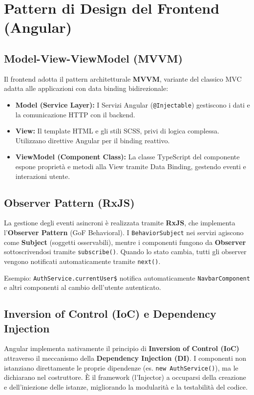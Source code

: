 \section{Pattern di Design del Frontend (Angular)}

\subsection{Model-View-ViewModel (MVVM)}
Il frontend adotta il pattern architetturale \textbf{MVVM}, variante del classico MVC 
adatta alle applicazioni con data binding bidirezionale:
\begin{itemize}
    \item \textbf{Model (Service Layer):} I Servizi Angular (\texttt{@Injectable}) 
    gestiscono i dati e la comunicazione HTTP con il backend.
    \item \textbf{View:} Il template HTML e gli stili SCSS, privi di logica complessa. 
    Utilizzano direttive Angular per il binding reattivo.
    \item \textbf{ViewModel (Component Class):} La classe TypeScript del componente 
    espone proprietà e metodi alla View tramite Data Binding, gestendo eventi e 
    interazioni utente.
\end{itemize}

\subsection{Observer Pattern (RxJS)}
La gestione degli eventi asincroni è realizzata tramite \textbf{RxJS}, che implementa 
l'\textbf{Observer Pattern} (GoF Behavioral). I \texttt{BehaviorSubject} nei servizi 
agiscono come \textbf{Subject} (soggetti osservabili), mentre i componenti fungono da 
\textbf{Observer} sottoscrivendosi tramite \texttt{subscribe()}. Quando lo stato cambia, 
tutti gli observer vengono notificati automaticamente tramite \texttt{next()}.

Esempio: \texttt{AuthService.currentUser\$} notifica automaticamente \texttt{NavbarComponent} 
e altri componenti al cambio dell'utente autenticato.

\subsection{Inversion of Control (IoC) e Dependency Injection}
Angular implementa nativamente il principio di \textbf{Inversion of Control (IoC)} attraverso il meccanismo della \textbf{Dependency Injection (DI)}. I componenti non istanziano direttamente le proprie dipendenze (es. \texttt{new AuthService()}), ma le dichiarano nel costruttore. È il framework (l'Injector) a occuparsi della creazione e dell'iniezione delle istanze, migliorando la modularità e la testabilità del codice.

